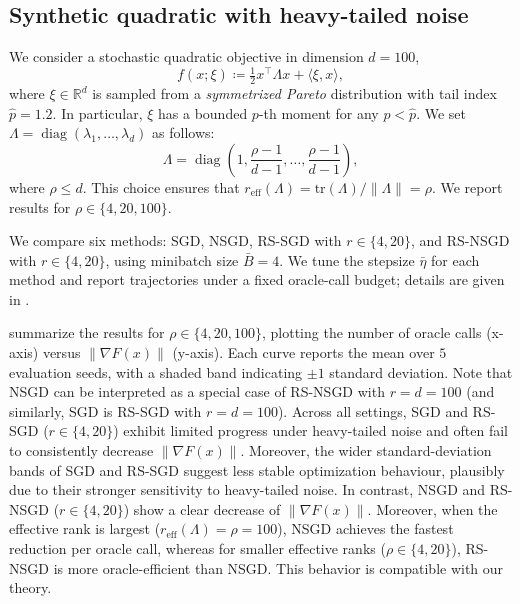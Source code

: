 \documentclass[10pt]{article}
\DeclareMathOperator{\diag}{diag}
\begin{document}
\subsection{Synthetic quadratic with heavy-tailed noise}
\label{sec:exp-synth}
We consider a stochastic quadratic objective in dimension $d=100$,
\begin{equation}
f(x;\xi)\coloneqq \tfrac12 x^\top \Lambda x + \langle \xi, x\rangle,
\label{eq:synth-obj}
\end{equation}
where $\xi\in\mathbb{R}^d$ is sampled from a \emph{symmetrized Pareto} distribution with tail index
$\hat{p}=1.2$. In particular, $\xi$ has a bounded $p$-th moment for any $p<\hat{p}$.
We set $\Lambda=\diag(\lambda_1,\ldots,\lambda_d)$ as follows:
\begin{equation}
\Lambda=\diag\!\left(1,\frac{\rho-1}{d-1},\ldots,\frac{\rho-1}{d-1}\right),
\label{eq:spectrum}
\end{equation}
where $\rho\le d$.
This choice ensures that $r_{\mathrm{eff}}(\Lambda)=\mathrm{tr}(\Lambda)/\|\Lambda\|=\rho$.
We report results for $\rho\in\{4,20,100\}$.


We compare six methods: SGD, NSGD, RS-SGD with $r\in\{4,20\}$, and RS-NSGD with $r\in\{4,20\}$, using minibatch size $\bar{B}=4$.
We tune the stepsize $\bar{\eta}$ for each method and report trajectories under a fixed oracle-call budget; details are given in .

 summarize the results for $\rho\in\{4,20,100\}$, plotting the number of oracle calls (x-axis) versus $\|\nabla F(x)\|$ (y-axis).
Each curve reports the mean over $5$ evaluation seeds, with a shaded band indicating $\pm 1$ standard deviation.
Note that NSGD can be interpreted as a special case of RS-NSGD with $r=d=100$ (and similarly, SGD is RS-SGD with $r=d=100$).
Across all settings, SGD and RS-SGD ($r\in\{4,20\}$) exhibit limited progress under heavy-tailed noise and often fail to consistently decrease $\|\nabla F(x)\|$. Moreover, the wider standard-deviation bands of SGD and RS-SGD suggest less stable optimization behaviour, plausibly due to their stronger sensitivity to heavy-tailed noise.
In contrast, NSGD and RS-NSGD ($r\in\{4,20\}$) show a clear decrease of $\|\nabla F(x)\|$.
Moreover, when the effective rank is largest ($r_{\mathrm{eff}}(\Lambda)=\rho=100$), NSGD achieves the fastest reduction per oracle call, whereas for smaller effective ranks ($\rho\in\{4,20\}$), RS-NSGD is more oracle-efficient than NSGD. This behavior is compatible with our theory.
\end{document}
